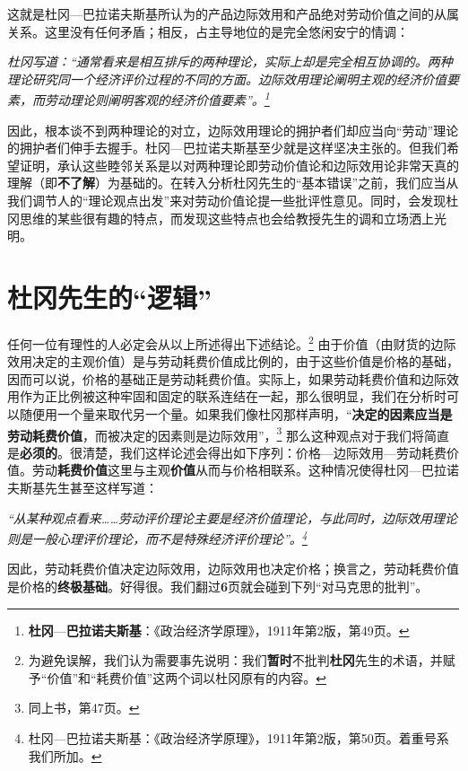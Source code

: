 \documentclass[fontset=fandol, a4paper, 12pt, openright]{ctexbook}
\renewenvironment{quote}
  {\list{}{\rightmargin\leftmargin}%
   \item\relax\small\itshape\color{darkgray}}
  {\endlist}
\begin{document}
这就是杜冈—巴拉诺夫斯基所认为的产品边际效用和产品绝对劳动价值之间的从属关系。这里没有任何矛盾；相反，占主导地位的是完全悠闲安宁的情调：

\begin{quote}
杜冈写道：“通常看来是相互排斥的两种理论，实际上却是完全相互协调的。两种理论研究同一个经济评价过程的不同的方面。边际效用理论阐明主观的经济价值要素，而劳动理论则阐明客观的经济价值要素”。\footnote{\textbf{杜冈}—\textbf{巴拉诺夫斯基}：《政治经济学原理》，1911年第2版，第49页。}
\end{quote}

因此，根本谈不到两种理论的对立，边际效用理论的拥护者们却应当向“劳动”理论的拥护者们伸手去握手。杜冈—巴拉诺夫斯基至少就是这样坚决主张的。但我们希望证明，承认这些睦邻关系是以对两种理论即劳动价值论和边际效用论非常天真的理解（即\textbf{不了解}）为基础的。在转入分析杜冈先生的“基本错误”之前，我们应当从我们调节人的“理论观点出发”来对劳动价值论提一些批评性意见。同时，会发现杜冈思维的某些很有趣的特点，而发现这些特点也会给教授先生的调和立场洒上光明。

\section{杜冈先生的“逻辑”}

任何一位有理性的人必定会从以上所述得出下述结论。\footnote{为避免误解，我们认为需要事先说明：我们\textbf{暂时}不批判\textbf{杜冈}先生的术语，并赋予“价值”和“耗费价值”这两个词以杜冈原有的内容。} 由于价值（由财货的边际效用决定的主观价值）是与劳动耗费价值成比例的，由于这些价值是价格的基础，因而可以说，价格的基础正是劳动耗费价值。实际上，如果劳动耗费价值和边际效用作为正比例被这种牢固和固定的联系连结在一起，那么很明显，我们在分析时可以随便用一个量来取代另一个量。如果我们像杜冈那样声明，“\textbf{决定的因素应当是劳动耗费价值}，而被决定的因素则是边际效用”，\footnote{同上书，第47页。} 那么这种观点对于我们将简直是\textbf{必须的}。很清楚，我们这样论述会得出如下序列：价格—边际效用—劳动耗费价值。劳动\textbf{耗费价值}这里与主观\textbf{价值}从而与价格相联系。这种情况使得杜冈—巴拉诺夫斯基先生甚至这样写道：

\begin{quote}
“从某种观点看来……劳动评价理论主要是经济价值理论，与此同时，边际效用理论则是一般心理评价理论，而不是特殊经济评价理论”。\footnote{杜冈—巴拉诺夫斯基：《政治经济学原理》，1911年第2版，第50页。着重号系我们所加。}
\end{quote}

因此，劳动耗费价值决定边际效用，边际效用也决定价格；换言之，劳动耗费价值是价格的\textbf{终极基础}。好得很。我们翻过\textbf{6}页就会碰到下列“对马克思的批判”。
\end{document}
